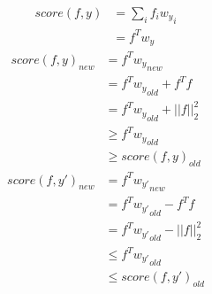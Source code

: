 \documentclass[12pt, fleqn]{article}
\begin{document}
\subsubsection{}
\begin{equation*}
  \begin{aligned}
    score(f, y) & = \sum_i f_i {w_y}_i \\
                & = f^T w_y
  \end{aligned}
\end{equation*}
\begin{equation*}
  \begin{aligned}
    score(f, y)_{new} & = f^T {w_y}_{new}             \\
                      & = f^T {w_y}_{old} + f^T f     \\
                      & = f^T {w_y}_{old} + ||f||_2^2 \\
                      & \ge f^T {w_y}_{old}           \\
                      & \ge score(f, y)_{old}
  \end{aligned}
\end{equation*}
\begin{equation*}
  \begin{aligned}
    score(f, y')_{new} & = f^T {w_{y'}}_{new}             \\
                       & = f^T {w_{y'}}_{old} - f^T f     \\
                       & = f^T {w_{y'}}_{old} - ||f||_2^2 \\
                       & \le f^T {w_{y'}}_{old}           \\
                       & \le score(f, y')_{old}
  \end{aligned}
\end{equation*}
\end{document}

